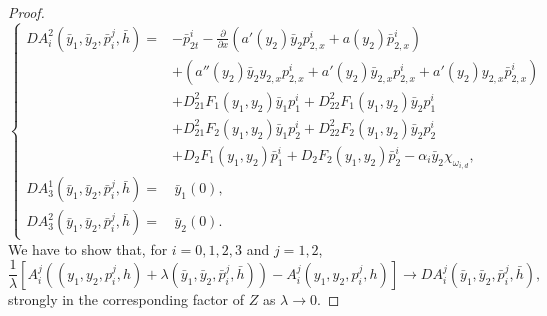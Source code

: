 \documentclass[11pt,a4paper]{amsart}
\numberwithin{equation}{section}
\begin{document}
\begin{proof}
\begin{equation*}
\begin{cases}
		      D A^2_i(\bar y_1,\bar y_2,\bar p_i^j,\bar h) =& - \bar p_{2t}^i - \frac{\partial}{\partial x}\left(a'(y_{2})\bar y_{2} p^i_{2,x} + a(y_{2}) \bar p^i_{2,x}\right) \\
            &+ \left( a''(y_{2})\bar y_{2} y_{2,x} p^i_{2,x} +  a'(y_{2})\bar y_{2,x}  p^i_{2,x} + a'(y_2)y_{2,x} \bar p^i_{2,x} \right)\\
            &+ D_{21}^2 F_1(y_1,y_2)\bar y_1 p^i_1 + D_{22}^2 F_1(y_1,y_2)\bar y_2 p^i_1 \\
            &+ D_{21}^2 F_2(y_1,y_2)\bar y_1 p^i_2 + D_{22}^2 F_2(y_1,y_2)\bar y_2 p^i_2 \\
            &+ D_2 F_1(y_1,y_2) \bar p^i_1 + D_2 F_2(y_1,y_2) \bar p^i_2 
            - \alpha_i \bar y_2 \chi_{\omega_{i,d}}, \\
		      D A^1_3(\bar y_1,\bar y_2,\bar p_i^j,\bar h) =& \, \bar y_1(0),\\
		      D A^2_3(\bar y_1,\bar y_2,\bar p_i^j,\bar h) =& \, \bar y_2(0).
        \end{cases}
    \end{equation*}We have to show that, for $i=0,1,2,3$ and $j=1,2$, 
    $$
        \frac{1}{\lambda}\left[ A^j_i (( y_1, y_2, p_i^j, h)+\lambda(\bar y_1,\bar y_2,\bar p_i^j,\bar h)) - A^j_i ( y_1, y_2, p_i^j, h) \right] \to D A^j_i(\bar y_1,\bar y_2,\bar p_i^j,\bar h),
    $$
    strongly in the corresponding factor of $Z$ as $\lambda \to 0$.


\end{proof}
\end{document}
